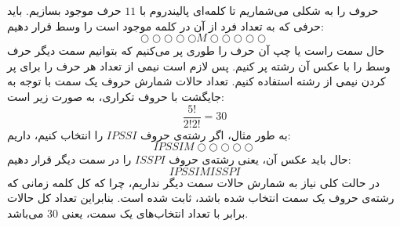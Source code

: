 \p
حروف را به شکلی می‌شماریم تا کلمه‌ای پالیندروم با
$11$
حرف موجود بسازیم. باید حرفی که به تعداد فرد از آن در کلمه موجود است را وسط قرار ‌دهیم:
$$\bigcirc\bigcirc\bigcirc\bigcirc\bigcirc M\bigcirc\bigcirc\bigcirc\bigcirc\bigcirc$$
حال سمت راست یا چپ آن حرف را طوری پر می‌کنیم که بتوانیم سمت دیگر حرف وسط را با عکس آن رشته پر کنیم. پس لازم است نیمی از تعداد هر حرف را برای پر کردن نیمی از رشته استفاده کنیم. تعداد حالات شمارش حروف یک سمت با توجه به جایگشت با حروف تکراری، به صورت زیر است:
$$\frac{5!}{2!2!} = 30$$
به طور مثال، اگر رشته‌ی حروف
$IPSSI$
را انتخاب کنیم، داریم:
$$IPSSIM\bigcirc\bigcirc\bigcirc\bigcirc\bigcirc$$
\p
حال باید عکس آن، یعنی رشته‌ی حروف
$ISSPI$
را در سمت دیگر قرار دهیم:
$$IPSSIMISSPI$$
در حالت کلی نیاز به شمارش حالات سمت دیگر نداریم، چرا که کل کلمه زمانی که رشته‌ی حروف یک سمت انتخاب شده باشد، ثابت شده است. بنابراین تعداد کل حالات برابر با تعداد انتخاب‌های یک سمت، یعنی
$30$
می‌باشد.